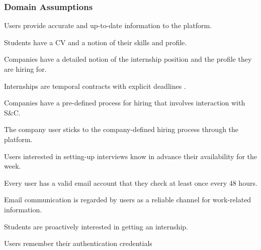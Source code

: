 \subsubsection{Domain Assumptions}
    \begin{enumerate}[label={[DA\arabic*]}]
        \item Users provide accurate and up-to-date information to the platform.
        \item Students have a CV and a notion of their skills and profile.
        \item Companies have a detailed notion of the internship position and the profile they are hiring for.
        \item Internships are temporal contracts with explicit deadlines .
        \item Companies have a pre-defined process for hiring that involves interaction with S\&C.
        \item The company user sticks to the company-defined hiring process through the platform.
        \item Users interested in setting-up interviews know in advance their availability for the week.
        \item Every user has a valid email account that they check at least once every 48 hours.
        \item Email communication is regarded by users as a reliable channel for work-related information.
        \item Students are proactively interested in getting an internship.
        \item Users remember their authentication credentials
    \end{enumerate}
